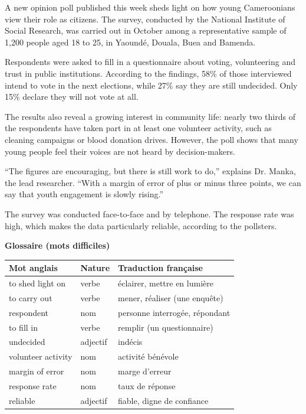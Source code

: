 \documentclass[11pt]{article}
\begin{document}
\begin{textebox}
A new opinion poll published this week sheds light on how young Cameroonians view their role as citizens. The survey, conducted by the National Institute of Social Research, was carried out in October among a representative sample of 1,200 people aged 18 to 25, in Yaoundé, Douala, Buea and Bamenda.

Respondents were asked to fill in a questionnaire about voting, volunteering and trust in public institutions. According to the findings, 58\% of those interviewed intend to vote in the next elections, while 27\% say they are still undecided. Only 15\% declare they will not vote at all.

The results also reveal a growing interest in community life: nearly two thirds of the respondents have taken part in at least one volunteer activity, such as cleaning campaigns or blood donation drives. However, the poll shows that many young people feel their voices are not heard by decision-makers.

“The figures are encouraging, but there is still work to do,” explains Dr. Manka, the lead researcher. “With a margin of error of plus or minus three points, we can say that youth engagement is slowly rising.”

The survey was conducted face-to-face and by telephone. The response rate was high, which makes the data particularly reliable, according to the pollsters.
\end{textebox}

\textbf{Glossaire (mots difficiles)}

\begin{center}
\begin{tabularx}{\linewidth}{|l|l|X|}
\hline
\rowcolor{popblueL} Mot anglais & Nature & Traduction française \\
\hline
to shed light on & verbe & éclairer, mettre en lumière \\
\hline
to carry out & verbe & mener, réaliser (une enquête) \\
\hline
respondent & nom & personne interrogée, répondant \\
\hline
to fill in & verbe & remplir (un questionnaire) \\
\hline
undecided & adjectif & indécis \\
\hline
volunteer activity & nom & activité bénévole \\
\hline
margin of error & nom & marge d'erreur \\
\hline
response rate & nom & taux de réponse \\
\hline
reliable & adjectif & fiable, digne de confiance \\
\hline
\end{tabularx}
\end{center}
\end{document}
